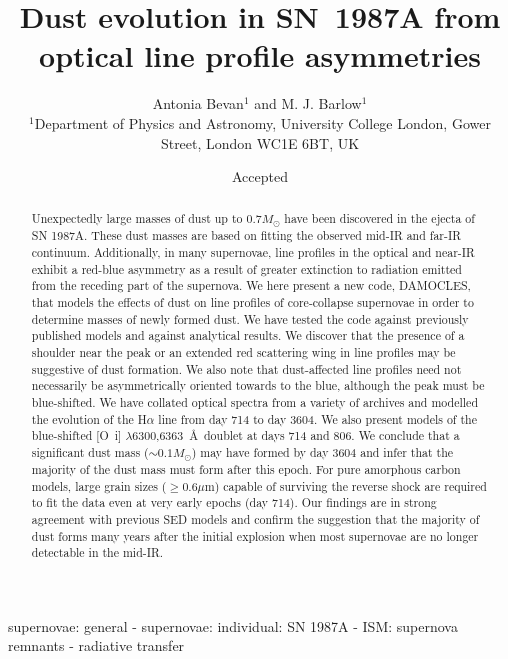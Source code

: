 \documentclass[useAMS,usenatbib,usegraphicx]{mnras}
\title[The first ten years of dust evolution in SN~1987A from 
optical line profile asymmetries]{Dust evolution in SN~1987A from optical 
line profile asymmetries}
\author[Antonia Bevan and M. J. Barlow]{Antonia Bevan$^{1}$ and M. J. 
Barlow$^{1}$\\
$^{1}$Department of Physics and Astronomy, University College London, 
Gower Street, London WC1E 6BT, UK}
\begin{document}
\date{Accepted}

\pagerange{\pageref{firstpage}--\pageref{lastpage}} 

\maketitle

\label{firstpage}

\begin{abstract}

Unexpectedly large masses of dust up to $0.7M_{\odot}$ have been 
discovered in the ejecta of SN 1987A.  These dust masses are based on 
fitting the observed mid-IR and far-IR continuum.  Additionally, in many 
supernovae, line profiles in the optical and near-IR exhibit a red-blue 
asymmetry as a result of greater extinction to radiation emitted from the 
receding part of the supernova.  We here present a new code, DAMOCLES, 
that models the effects of dust on line profiles of core-collapse 
supernovae in order to determine masses of newly formed dust.  We have 
tested the code against previously published models and against analytical 
results.  We discover that the presence of a shoulder near the peak or an 
extended red scattering wing in line profiles may be suggestive of dust 
formation.  We also note that dust-affected line profiles need not 
necessarily be asymmetrically oriented towards to the blue, although the 
peak must be blue-shifted. We have collated optical spectra from a variety 
of archives and modelled the evolution of the H$\alpha$ line from day 714 
to day 3604.  We also present models of the blue-shifted 
[O~{\sc i}] $\lambda$6300,6363~\AA\ doublet at days 714 and 806.  We 
conclude that a significant dust mass ($\sim 0.1M_{\odot}$) may have 
formed by day 3604 and infer that the majority of the dust mass must 
form after this epoch.  For pure amorphous carbon models, large grain 
sizes ($\geqslant 0.6\mu$m) capable of surviving the reverse shock are 
required to fit the data even at very early epochs (day 714).  Our 
findings are in strong agreement with previous SED models and confirm 
the suggestion that the majority of dust forms many years after the 
initial explosion when most supernovae are no longer detectable in the 
mid-IR.

\end{abstract}

\begin{keywords}
supernovae: general  -  supernovae: individual: SN 1987A  -  ISM: 
supernova remnants  - radiative transfer
\end{keywords}
\end{document}
